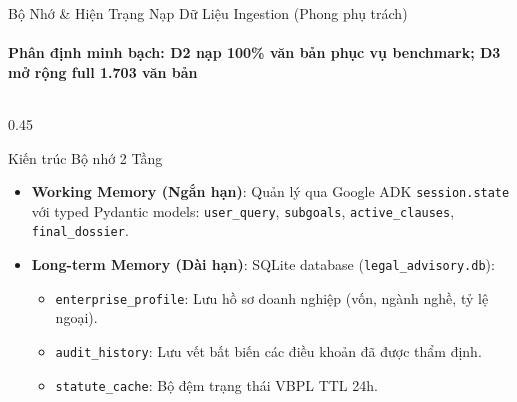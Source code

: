 \documentclass[aspectratio=169,10pt,xcolor={table}]{beamer}
\begin{document}
\begin{frame}{Bộ Nhớ \& Hiện Trạng Nạp Dữ Liệu Ingestion (Phong phụ trách)}
\framesubtitle{Phân định minh bạch: D2 nạp 100\% văn bản phục vụ benchmark; D3 mở rộng full 1.703 văn bản}
\begin{columns}[T]
\begin{column}{0.45\textwidth}
\begin{block}{\small Kiến trúc Bộ nhớ 2 Tầng}
\footnotesize
\begin{itemize}
  \item \textbf{Working Memory (Ngắn hạn)}: Quản lý qua Google ADK \texttt{session.state} với typed Pydantic models: \texttt{user\_query}, \texttt{subgoals}, \texttt{active\_clauses}, \texttt{final\_dossier}.
  \item \textbf{Long-term Memory (Dài hạn)}: SQLite database (\texttt{legal\_advisory.db}):
    \begin{itemize}\scriptsize
      \item \texttt{enterprise\_profile}: Lưu hồ sơ doanh nghiệp (vốn, ngành nghề, tỷ lệ ngoại).
      \item \texttt{audit\_history}: Lưu vết bất biến các điều khoản đã được thẩm định.
      \item \texttt{statute\_cache}: Bộ đệm trạng thái VBPL TTL 24h.
    \end{itemize}
\end{itemize}
\end{block}
\end{column}


\end{columns}
\end{frame}
\end{document}
